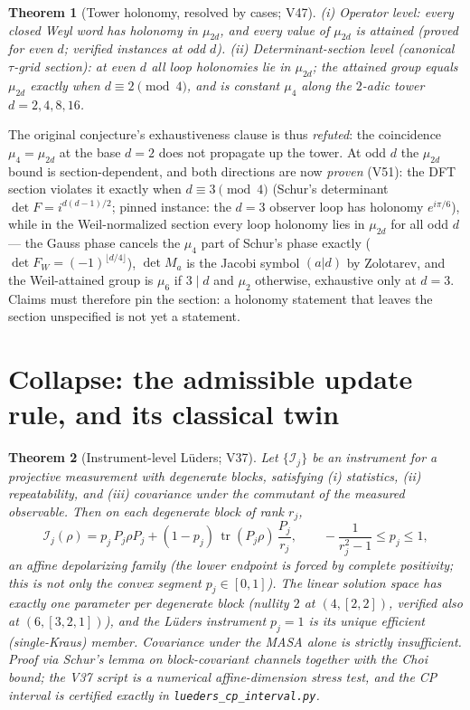 \documentclass[11pt]{article}
\newtheorem{theorem}{Theorem}
\theoremstyle{definition}
\theoremstyle{remark}
\begin{document}
\begin{theorem}[Tower holonomy, resolved by cases; V47]\label{conj:tower}
(i) \emph{Operator level:} every closed Weyl word has holonomy in $\mu_{2d}$, and
every value of $\mu_{2d}$ is attained (proved for even $d$; verified instances at odd
$d$). (ii) \emph{Determinant-section level} (canonical $\tau$-grid section): at even
$d$ all loop holonomies lie in $\mu_{2d}$; the attained group equals $\mu_{2d}$
exactly when $d\equiv 2 \pmod 4$, and is \emph{constant} $\mu_4$ along the $2$-adic
tower $d=2,4,8,16$.
\end{theorem}
The original conjecture's exhaustiveness clause is thus \emph{refuted}: the
coincidence $\mu_4=\mu_{2d}$ at the base $d=2$ does not propagate up the tower. At odd
$d$ the $\mu_{2d}$ bound is section-dependent, and both directions are now
\emph{proven} (V51): the DFT section violates it exactly when $d\equiv 3\pmod 4$
(Schur's determinant $\det F = i^{d(d-1)/2}$; pinned instance: the $d=3$ observer loop
has holonomy $e^{i\pi/6}$), while in the Weil-normalized section every loop holonomy
lies in $\mu_{2d}$ for all odd $d$ --- the Gauss phase cancels the $\mu_4$ part of
Schur's phase exactly ($\det F_W=(-1)^{\lfloor d/4\rfloor}$), $\det M_a$ is the Jacobi
symbol $(a|d)$ by Zolotarev, and the Weil-attained group is $\mu_6$ if $3\mid d$ and
$\mu_2$ otherwise, exhaustive only at $d=3$. Claims must therefore pin the section: a holonomy statement that
leaves the section unspecified is not yet a statement.

\section{Collapse: the admissible update rule, and its classical twin}\label{sec:collapse}
\begin{theorem}[Instrument-level L\"uders; V37]\label{thm:lueders}
Let $\{\mathcal I_j\}$ be an instrument for a projective measurement with degenerate
blocks, satisfying (i) statistics, (ii) repeatability, and (iii) covariance under the
commutant of the measured observable. Then on each degenerate block of rank $r_j$,
\[
\mathcal I_j(\rho)=p_j\,P_j\rho P_j+(1-p_j)\,\operatorname{tr}(P_j\rho)\,\frac{P_j}{r_j},
\qquad -\frac{1}{r_j^{2}-1}\le p_j\le 1,
\]
an \emph{affine} depolarizing family (the lower endpoint is forced by complete positivity; this is
\emph{not} only the convex segment $p_j\in[0,1]$). The linear solution space has exactly one parameter
per degenerate block (nullity $2$ at $(4,[2,2])$, verified also at $(6,[3,2,1])$), and the L\"uders
instrument $p_j=1$ is its unique efficient (single-Kraus) member. Covariance under the MASA alone is
strictly insufficient. Proof via Schur's lemma on block-covariant channels together with the Choi
bound; the V37 script is a numerical affine-dimension stress test, and the CP interval is certified
exactly in \texttt{lueders\_cp\_interval.py}.
\end{theorem}
\end{document}
